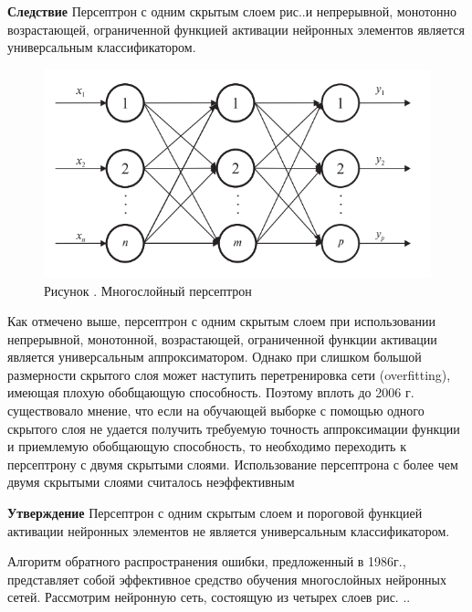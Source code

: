 	\par \redline \textbf{Следствие} Персептрон с одним скрытым слоем рис.\thechaptercntr.\theimagecntr \spc и непрерывной,
	монотонно возрастающей, ограниченной функцией активации нейронных элементов является универсальным классификатором.
	
	\begin{figure}[H]
		\centering
		\def\svgwidth{\textwidth}
		\includegraphics[scale=1.2]{images/one_hidden_perceptron.png}
		\caption*{\gostFont Рисунок \thechaptercntr .\theimagecntr \spc {--} Многослойный персептрон}
	\end{figure}  \addtocounter{imagecntr}{1}
	
	\par \redline Как отмечено выше, персептрон с одним скрытым слоем при использовании непрерывной, монотонной, возрастающей, ограниченной
	функции активации является универсальным аппроксиматором. Однако
	при слишком большой размерности скрытого слоя может наступить
	перетренировка сети (overfitting), имеющая плохую обобщающую способность. Поэтому вплоть до 2006 г. существовало мнение, что если на
	обучающей выборке с помощью одного скрытого слоя не удается получить требуемую точность аппроксимации функции и приемлемую
	обобщающую способность, то необходимо переходить к персептрону с
	двумя скрытыми слоями. Использование персептрона с более чем двумя скрытыми слоями считалось неэффективным
	
	\par \redline \textbf{Утверждение} Персептрон с одним скрытым слоем и пороговой
	функцией активации нейронных элементов не является универсальным
	классификатором.
	
	\par \redline Алгоритм обратного распространения ошибки, предложенный в 1986г., представляет собой эффективное средство обучения многослойных нейронных сетей. Рассмотрим нейронную сеть, состоящую из четырех слоев рис. \thechaptercntr.\theimagecntr.
	
